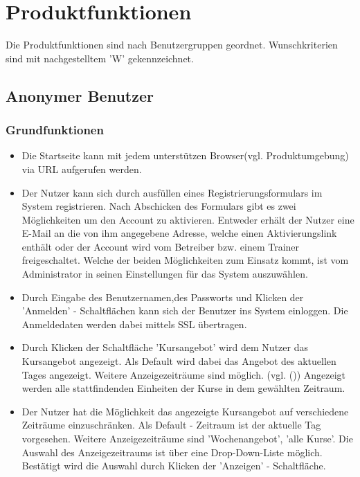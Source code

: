 \documentclass[a4paper]{scrreprt}
\begin{document}
\chapter{Produktfunktionen}
Die Produktfunktionen sind nach Benutzergruppen geordnet. Wunschkriterien sind mit nachgestelltem 'W' gekennzeichnet.

\section{Anonymer Benutzer}
\subsection{Grundfunktionen}
\begin{itemize}
	\item {}
	Die Startseite kann mit jedem unterstützen Browser(vgl. Produktumgebung) via URL aufgerufen werden.
	\item {}
	Der Nutzer kann sich durch ausfüllen eines Registrierungsformulars im System registrieren. Nach Abschicken des Formulars gibt es zwei Möglichkeiten um den Account zu aktivieren. Entweder erhält der Nutzer eine E-Mail an die von ihm angegebene Adresse, welche einen Aktivierungslink enthält oder der Account wird vom Betreiber bzw. einem Trainer freigeschaltet. Welche der beiden Möglichkeiten zum Einsatz kommt, ist vom Administrator in seinen Einstellungen für das System auszuwählen.
	\item {}
	Durch Eingabe des Benutzernamen,des Passworts und Klicken der 'Anmelden' - Schaltflächen kann sich der Benutzer ins System einloggen. Die Anmeldedaten werden dabei mittels SSL übertragen.
	\item {}
	Durch Klicken der Schaltfläche 'Kursangebot' wird dem Nutzer das Kursangebot angezeigt. Als Default wird dabei das Angebot des aktuellen Tages angezeigt. Weitere Anzeigezeiträume sind möglich. (vgl. ()) Angezeigt werden alle stattfindenden Einheiten der Kurse in dem gewählten Zeitraum.
	\item {}
	Der Nutzer hat die Möglichkeit das angezeigte Kursangebot auf verschiedene Zeiträume einzuschränken. Als Default - Zeitraum ist der aktuelle Tag vorgesehen. Weitere Anzeigezeiträume sind 'Wochenangebot', 'alle Kurse'. Die Auswahl des Anzeigezeitraums ist über eine Drop-Down-Liste möglich. Bestätigt wird die Auswahl durch Klicken der 'Anzeigen' - Schaltfläche.

\end{itemize}
\end{document}
